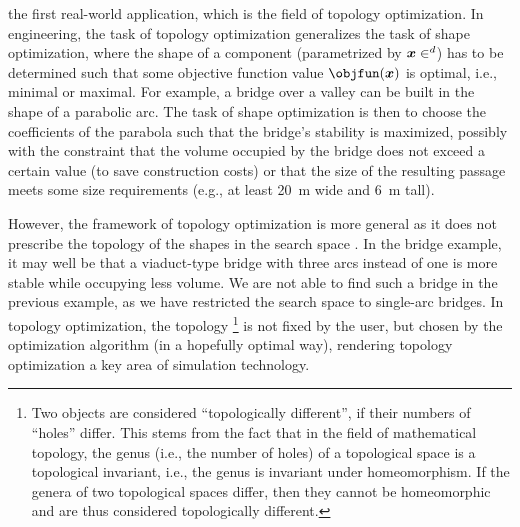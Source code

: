 
\label{chap:60topoOpt}

the first real-world application,
which is the field of topology optimization.
In engineering,
the task of topology optimization generalizes the
task of shape optimization, where the shape of a component
(parametrized by $\*x \in \real^d$) has to be
determined such that some objective function value $\objfun(\*x)$ is optimal,
i.e., minimal or maximal.
For example, a bridge over a valley can be built in the shape of a
parabolic arc.
The task of shape optimization is then to choose the coefficients of the
parabola such that the bridge's stability is maximized,
possibly with the constraint that the volume occupied by the bridge
does not exceed a certain value (to save construction costs) or
that the size of the resulting passage meets some size requirements
(e.g., at least \SI{20}{\meter} wide and \SI{6}{\meter} tall).

However, the framework of topology optimization is more general as
it does not prescribe the topology
of the shapes in the search space \cite{Allaire16Towards}.
In the bridge example, it may well be that a viaduct-type bridge with
three arcs instead of one is more stable while occupying less volume.
We are not able to find such a bridge in the previous example,
as we have restricted the search space to single-arc bridges.
In topology optimization, the topology%
\footnote{%
  Two objects are considered ``topologically different'',
  if their numbers of ``holes'' differ.
  This stems from the fact that in the field of mathematical topology,
  the genus (i.e., the number of holes)
  of a topological space is a topological invariant, i.e.,
  the genus is invariant under homeomorphism.
  If the genera of two topological spaces differ, then they cannot be
  homeomorphic and are thus considered topologically different.%
}
is not fixed by the user,
but chosen by the optimization algorithm (in a hopefully optimal way),
rendering topology optimization a key area of simulation technology.

